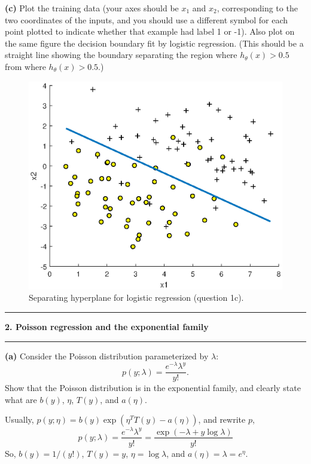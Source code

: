 \documentclass[11pt]{article}
\newcommand\question[2]{\vspace{.25in}\hrule\textbf{#1. #2}\vspace{.5em}\hrule\vspace{.10in}}
\renewcommand\part[1]{\vspace{.10in}\textbf{(#1)  }}
\begin{document}
\part{c}Plot the training data (your axes should be $x_1$ and $x_2$, corresponding to the two coordinates of the inputs, and you should use a different symbol for each point plotted to indicate whether that example had label 1 or -1). Also plot on the same figure the decision boundary fit by logistic regression. (This should be a straight line showing the boundary separating the region where $h_\theta(x) > 0.5$ from where $h_\theta(x) > 0.5$.)

\begin{figure}[htbp]
  \centering
  \includegraphics{ps1q1c}
  \caption{Separating hyperplane for logistic regression (question 1c).}\label{q1c}
\end{figure}

\question{2}{Poisson regression and the exponential family}
\part{a} Consider the Poisson distribution parameterized by $\lambda$:
$$p(y; \lambda) = \frac{e^{-\lambda}\lambda^y}{y!}.$$
Show that the Poisson distribution is in the exponential family, and clearly state what are $b(y)$, $\eta$, $T(y)$, and $a(\eta)$.

Usually, $p(y; \eta) = b(y)\exp{(\eta^TT(y)-a(\eta))}$, and rewrite $p$,
$$p(y; \lambda) = \frac{e^{-\lambda}\lambda^y}{y!} = \frac{\exp{(-\lambda+y\log\lambda)}}{y!}$$
So, $b(y) = 1/(y!)$, $T(y)=y$, $\eta = \log \lambda$, and $a(\eta) = \lambda = e^\eta$.
\end{document}
